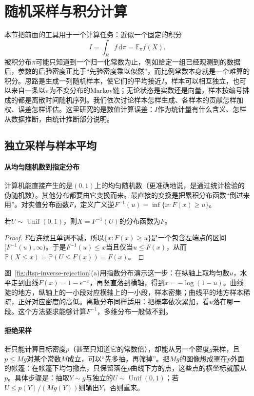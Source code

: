 \section{随机采样与积分计算}
\label{sec:dtsp-sampling}

本节把前面的工具用于一个计算任务：近似一个固定的积分
\[
  I=\int_Ef\,\mathrm d\pi=\mathbb E_\pi f(X).
\]
被积分布$\pi$可能只知道到一个归一化常数为止，例如给定一组已经观测到的数据后，参数的后验密度正比于“先验密度乘以似然”，而比例常数本身就是一个难算的积分。思路是生成一列随机样本，使它们的平均接近$I$。样本可以相互独立，也可以来自一条以$\pi$为不变分布的Markov链；无论状态是实数还是向量，样本按编号排成的都是离散时间随机序列。我们依次讨论样本怎样生成、各样本的贡献怎样加权、误差怎样评估。这里研究的是数值计算误差：$I$作为统计量有什么含义、怎样从数据推断，由统计推断部分说明。

\subsection{独立采样与样本平均}
\label{sec:dtsp-iid-sampling}

\paragraph{从均匀随机数到指定分布}
计算机能直接产生的是$(0,1)$上的均匀随机数（更准确地说，是通过统计检验的伪随机数）。其他分布都要由它变换而来。最直接的变换是把累积分布函数“倒过来用”。对实值分布函数$F$，定义广义逆$F^{-1}(u)=\inf\{x:F(x)\geq u\}$。

\begin{theorem}[逆变换采样]
  \label{thm:dtsp-inverse-transform}
  若$U\sim\operatorname{Unif}(0,1)$，则$X=F^{-1}(U)$的分布函数为$F$。
\end{theorem}

\begin{proof}
$F$右连续且单调不减，所以$\{x:F(x)\geq u\}$是一个包含左端点的区间$[F^{-1}(u),\infty)$。于是$F^{-1}(u)\leq x$当且仅当$u\leq F(x)$，从而$\mathbb P(X\leq x)=\mathbb P(U\leq F(x))=F(x)$。
\end{proof}

图~\ref{fig:dtsp-inverse-rejection}(a)用指数分布演示这一步：在纵轴上取均匀数$u$，水平走到曲线$F(x)=1-e^{-x}$，再竖直落到横轴，得到$x=-\log(1-u)$。曲线陡的地方，纵轴上的一小段对应横轴上的一小段，样本密集；曲线平的地方样本稀疏，正好对应密度的高低。离散分布同样适用：把概率依次累加，看$u$落在哪一段。这个方法要求能够计算$F^{-1}$，多维分布一般做不到。

\paragraph{拒绝采样}
若只能计算目标密度$p$（甚至只知道它的常数倍），却能从另一个密度$g$采样，且$p\leq Mg$对某个常数$M$成立，可以“先多抽，再筛掉”。把$Mg$的图像想成罩在$p$外面的帐篷：在帐篷下均匀撒点，只保留落在$p$曲线下方的点，这些点的横坐标就服从$p$。具体步骤是：抽取$Y\sim g$与独立的$U\sim\operatorname{Unif}(0,1)$；若$U\leq p(Y)/(Mg(Y))$则输出$Y$，否则重来。

